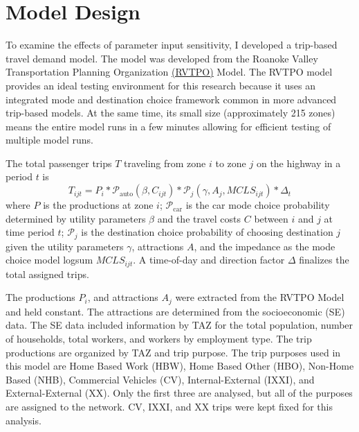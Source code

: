 \documentclass[fancy, masters]{byuthesis}
\begin{document}
\hypertarget{model-design}{%
\section{Model Design}\label{model-design}}

To examine the effects of parameter input sensitivity, I developed a trip-based travel demand model. The model was developed from the Roanoke Valley Transportation Planning Organization \href{https://github.com/xinwangvdot/rvtpo}{(RVTPO)} Model. The RVTPO model provides an ideal testing environment for this research because it uses an integrated mode and destination choice framework common in more advanced trip-based models. At the same time, its small size (approximately 215 zones) means the entire model runs in a few minutes allowing for efficient testing of multiple model runs.

The total passenger trips \(T\) traveling from zone \(i\) to zone \(j\) on the highway in a period \(t\) is
\begin{equation}
T_{ijt} = P_i * \mathcal{P}_{\mathrm{auto}}(\beta, C_{ijt}) * \mathcal{P}_j(\gamma, A_j, MCLS_{ijt}) * \Delta_t
\label{eq:trips}
\end{equation}
where \(P\) is the productions at zone \(i\); \(\mathcal{P}_{\mathrm{car}}\) is the car mode choice probability determined by utility parameters \(\beta\) and the travel costs \(C\) between \(i\) and \(j\) at time period \(t\); \(\mathcal{P}_{j}\) is the destination choice probability of choosing destination \(j\) given the utility parameters \(\gamma\), attractions \(A\), and the impedance as the mode choice model logsum \(MCLS_{ijt}\). A time-of-day and direction factor \(\Delta\) finalizes the total assigned trips.

The productions \(P_i\), and attractions \(A_j\) were extracted from the RVTPO Model and held constant. The attractions are determined from the socioeconomic (SE) data. The SE data included information by TAZ for the total population, number of households, total workers, and workers by employment type. The trip productions are organized by TAZ and trip purpose. The trip purposes used in this model are Home Based Work (HBW), Home Based Other (HBO), Non-Home Based (NHB), Commercial Vehicles (CV), Internal-External (IXXI), and External-External (XX). Only the first three are analysed, but all of the purposes are assigned to the network. CV, IXXI, and XX trips were kept fixed for this analysis.
\end{document}
